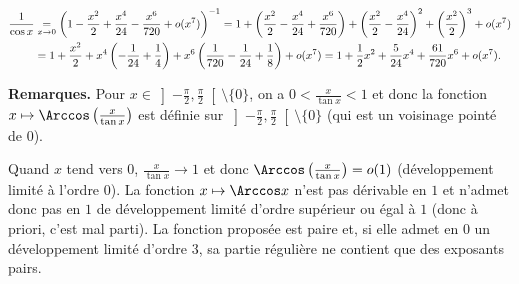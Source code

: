 {\begin{enumerate}
{\begin{center}
{}
\end{center}
\begin{align*}\ensuremath
\frac{1}{\cos x}&\underset{x\rightarrow0}{=}\left(1-\frac{x^2}{2}+\frac{x^4}{24}-\frac{x^6}{720}+o(x^7)\right)^{-1}
=1+\left(\frac{x^2}{2}-\frac{x^4}{24}+\frac{x^6}{720}\right)+\left(\frac{x^2}{2}-\frac{x^4}{24}\right)^2+\left(\frac{x^2}{2}\right)^3+o(x^7)\\
 &=1+\frac{x^2}{2}+x^4\left(-\frac{1}{24}+\frac{1}{4}\right)+x^6\left(\frac{1}{720}-\frac{1}{24}+\frac{1}{8}\right)+o(x^7)
=1+\frac{1}{2}x^2+\frac{5}{24}x^4+\frac{61}{720}x^6+o(x^7).
\end{align*}
\begin{center}
\end{center}
\textbf{Remarques.}  
Pour $x\in\left]-\frac{\pi}{2},\frac{\pi}{2}\right[\setminus\{0\}$, on a $0<\frac{x}{\tan x}<1$ et donc la fonction $x\mapsto\Arccos\left(\frac{x}{\tan x}\right)$ est définie sur $\left]-\frac{\pi}{2},\frac{\pi}{2}\right[\setminus\{0\}$ (qui est un voisinage pointé de $0$).\rule[-2mm]{0mm}{6mm}
Quand $x$ tend vers $0$, $\frac{x}{\tan x}\rightarrow1$ et donc $\Arccos\left(\frac{x}{\tan x}\right)=o(1)$ (développement limité à l'ordre $0$).
La fonction $x\mapsto\Arccos x$ n'est pas dérivable en $1$ et n'admet donc pas en $1$ de développement limité d'ordre supérieur ou égal à $1$ (donc à priori, c'est mal parti).
La fonction proposée est paire et, si elle admet en $0$ un développement limité d'ordre $3$, sa partie régulière ne contient que des exposants pairs.
}
\end{enumerate}
}

